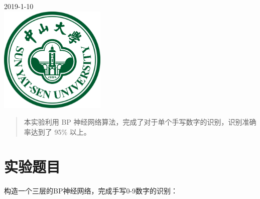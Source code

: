 \begin{titlepage}


{\large 2019-1-10}\\[1cm] %


\includegraphics[width=2in]{logo.png}\\[0.5cm] %
 

\vfill %

\end{titlepage}


\begin{abstract}
    
本实验利用 BP 神经网络算法，完成了对于单个手写数字的识别，识别准确率达到了 95\% 以上。

\end{abstract}

\section{实验题目}

构造一个三层的BP神经网络，完成手写0-9数字的识别：


